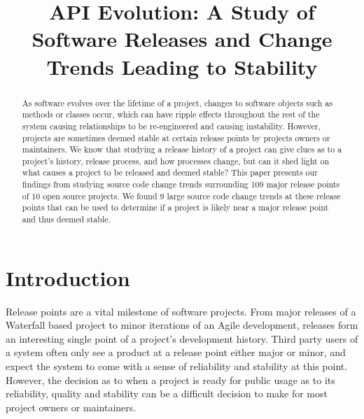 \documentclass[conference]{IEEEtran}
\begin{document}
\title{API Evolution: A Study of Software Releases and Change Trends Leading to Stability}

\author{
\and
{}
\and
{}
}

\maketitle

\begin{abstract}
As software evolves over the lifetime of a project, changes to software objects such as methods or classes occur, which can have ripple effects throughout
the rest of the system causing relationships to be re-engineered and causing instability. However, projects are sometimes deemed stable at certain release
points by projects owners or maintainers. We know that studying a release history of a project can give clues as to a project's history, release process,
and how processes change, but can it shed light on what causes a project to be released and deemed stable? This paper presents our findings from studying
source code change trends surrounding 109 major release points of 10 open source projects. We found 9 large source code change trends at these release
points that can be used to determine if a project is likely near a major release point and thus deemed stable. 
\end{abstract}

\section{Introduction}
Release points are a vital milestone of software projects. From major releases of a Waterfall based project to minor iterations of an Agile development,
releases form an interesting single point of a project's development history.
Third party users of a system often only see a product at a release point either major or minor,
and expect the system to come with a sense of reliability and stability at this point. However, the decision as to when a project is ready for public usage
as to its reliability, quality and stability can be a difficult decision to make for most project owners or maintainers.
\end{document}
